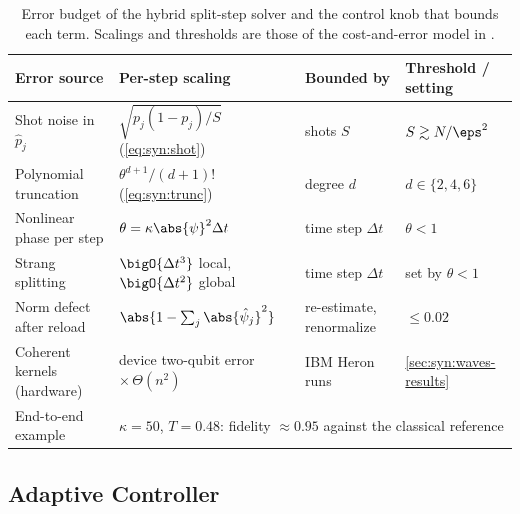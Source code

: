 \begin{table}[htbp]
\caption{Error budget of the hybrid split-step solver and the control knob that bounds each term. Scalings and thresholds are those of the cost-and-error model in \cite{guo2026nonlinearwaves}.}
\label{tab:syn:errorbudget}
\centering\footnotesize
\begin{tabularx}{\textwidth}{@{}p{3.0cm} X p{2.5cm} p{2.9cm}@{}}
\toprule
Error source & Per-step scaling & Bounded by & Threshold / setting \\
\midrule
Shot noise in $\hat p_j$ & $\sqrt{p_j(1-p_j)/S}$ (\cref{eq:syn:shot}) & shots $S$ & $S\gtrsim N/\eps^{2}$ \\
Polynomial truncation & $\theta^{d+1}/(d+1)!$ (\cref{eq:syn:trunc}) & degree $d$ & $d\in\{2,4,6\}$ \\
Nonlinear phase per step & $\theta=\kappa\abs{\psi}^{2}\Delta t$ & time step $\Delta t$ & $\theta<1$ \\
Strang splitting & $\bigO{\Delta t^{3}}$ local, $\bigO{\Delta t^{2}}$ global & time step $\Delta t$ & set by $\theta<1$ \\
Norm defect after reload & $\abs{1-\sum_j\abs{\hat\psi_j}^{2}}$ & re-estimate, renormalize & $\le 0.02$ \\
Coherent kernels (hardware) & device two-qubit error $\times\,\Theta(n^{2})$ & IBM Heron runs & \cref{sec:syn:waves-results} \\
\midrule
End-to-end example & \multicolumn{3}{l}{$\kappa=50$, $T=0.48$: fidelity $\approx 0.95$ against the classical reference} \\
\bottomrule
\end{tabularx}
\end{table}

\subsection{Adaptive Controller}\label{sec:syn:controller}


